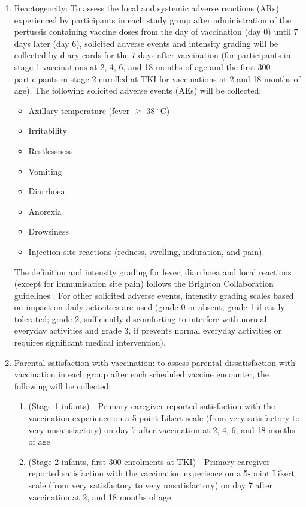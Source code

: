 \documentclass{bmcart}
\begin{document}
\begin{enumerate}
 \item Reactogencity: To assess the local and systemic adverse reactions (ARs) experienced by participants in each study group after administration of the pertussis containing vaccine doses from the day of vaccination (day 0) until 7 days later (day 6), solicited adverse events and intensity grading will be collected by diary cards for the 7 days after vaccination (for participants in stage 1 vaccinations at 2, 4, 6, and 18 months of age and the first 300 participants in stage 2 enrolled at TKI for vaccinations at 2 and 18 months of age). The following solicited adverse events (AEs) will be collected:
 \begin{itemize}
     \item Axillary temperature (fever $\geq$ 38 $^\circ$C)
     \item Irritability
     \item Restlessness
     \item Vomiting
     \item Diarrhoea
     \item Anorexia
     \item Drowsiness
     \item Injection site reactions (redness, swelling, induration, and pain).
 \end{itemize}
 The definition and intensity grading for fever, diarrhoea and  local  reactions  (except  for  immunisation  site  pain)  follows  the  Brighton  Collaboration  guidelines \cite{Marcy2004, Gidudu2011, Gidudu2008, Kohl2007a, Kohl2007b}. 
 For other solicited adverse events, intensity grading scales based on impact on daily activities are used  (grade 0 or absent; grade 1 if easily tolerated; grade 2, sufficiently discomforting to interfere with normal everyday activities and grade 3, if prevents normal everyday activities or requires significant medical intervention).
 \item Parental satisfaction with vaccination: to assess parental dissatisfaction with vaccination in each group after each scheduled vaccine encounter, the following will be collected:
 \begin{enumerate}
     \item (Stage 1 infants) - Primary caregiver reported satisfaction with the vaccination experience on a 5-point Likert scale (from very satisfactory to very unsatisfactory) on day 7 after vaccination at 2, 4, 6, and 18 months of age
     \item (Stage 2 infants, first 300 enrolments at TKI) - Primary caregiver reported satisfaction with the vaccination experience on a 5-point Likert scale (from very satisfactory to very unsatisfactory) on day 7 after vaccination at 2, and 18 months of age.
 \end{enumerate}
\end{enumerate}
\end{document}
